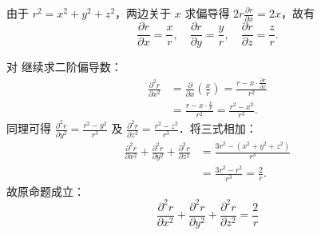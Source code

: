 \begin{myproof}
    由于 $r^2 = x^2 + y^2 + z^2$，两边关于 $x$ 求偏导得 $2r \frac{\partial r}{\partial x} = 2x$，故有
    \begin{equation}
        \frac{\partial r}{\partial x} = \frac{x}{r}, \quad \frac{\partial r}{\partial y} = \frac{y}{r}, \quad \frac{\partial r}{\partial z} = \frac{z}{r}. \label{eq:first-order}
    \end{equation}


    对  继续求二阶偏导数：
    \begin{equation}
        \begin{aligned}
            \frac{\partial^2 r}{\partial x^2} & = \frac{\partial}{\partial x} \left( \frac{x}{r} \right) = \frac{r - x \cdot \frac{\partial r}{\partial x}}{r^2} \\
                                              & = \frac{r - x \cdot \frac{x}{r}}{r^2} = \frac{r^2 - x^2}{r^3}.
        \end{aligned}
    \end{equation}
    同理可得 $\frac{\partial^2 r}{\partial y^2} = \frac{r^2 - y^2}{r^3}$ 及 $\frac{\partial^2 r}{\partial z^2} = \frac{r^2 - z^2}{r^3}$．将三式相加：
    \begin{equation}
        \begin{aligned}
            \frac{\partial^2 r}{\partial x^2} + \frac{\partial^2 r}{\partial y^2} + \frac{\partial^2 r}{\partial z^2} & = \frac{3r^2 - (x^2 + y^2 + z^2)}{r^3}  \\
                                                                                                                      & = \frac{3r^2 - r^2}{r^3} = \frac{2}{r}.
        \end{aligned}
    \end{equation}
    故原命题成立：
    \begin{equation}
        \boxed{\frac{\partial^2 r}{\partial x^2} + \frac{\partial^2 r}{\partial y^2} + \frac{\partial^2 r}{\partial z^2} = \frac{2}{r}}
    \end{equation}



\end{myproof}
